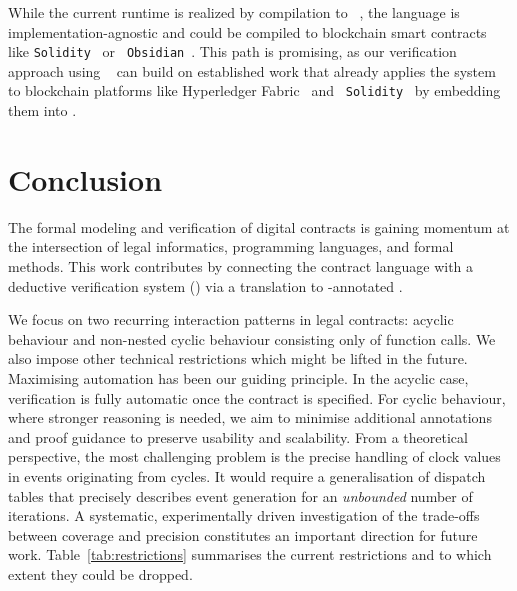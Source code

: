 \documentclass[runningheads]{llncs}
\begin{document}
While the current {\Stipula} runtime is realized by compilation to
{\Java}~\cite{stipulaprototype}, the language is
implementation-agnostic and could be compiled to blockchain smart
contracts like {\tt Solidity}~\cite{Solidity} or {\tt
  Obsidian}~\cite{Obsidian}.  This path is promising, as our
verification approach using {\KeY}~\cite{DBLP:series/lncs/10001} can
build on established work that already applies the system to
blockchain platforms like Hyperledger
Fabric~\cite{BeckertHerdaKirsten2018_1000092715} and {\tt
  Solidity}~\cite{DBLP:conf/isola/AhrendtB20} by embedding them into
\Java.


\section{Conclusion}
\label{sec:conclusion}

  The formal modeling and verification of digital contracts is
  gaining momentum at the intersection of legal informatics,
  programming languages, and formal methods.  This work contributes by
  connecting the contract language {\Stipula} with a deductive
  verification system (\KeY) via a translation to {\JML}-annotated
  {\Java}.
 
  We focus on two recurring interaction patterns in legal contracts:
  acyclic behaviour and non-nested cyclic behaviour consisting only of
  function calls. We also impose other technical restrictions which
  might be lifted in the future.  Maximising automation has been our
  guiding principle. In the acyclic case, verification is fully
  automatic once the contract is specified. For cyclic behaviour, where
  stronger reasoning is needed, we aim to minimise additional
  annotations and proof guidance to preserve usability and
  scalability. From a theoretical perspective, the most challenging
  problem is the precise handling of clock values in events
  originating from cycles. It would require a generalisation of
  dispatch tables that precisely describes event generation for an
  \emph{unbounded} number of iterations.
  A systematic, experimentally driven investigation of
  the trade-offs between coverage and precision constitutes an
  important direction for future work.  Table~\ref{tab:restrictions}
  summarises the current restrictions and to which extent they could
  be dropped.

  
  
\end{document}
